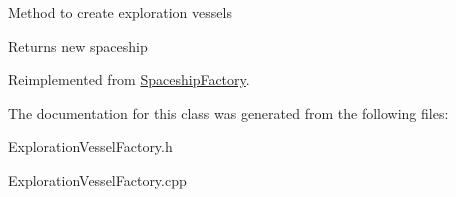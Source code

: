 Method to create exploration vessels \begin{DoxyReturn}{Returns}
new spaceship 
\end{DoxyReturn}


Reimplemented from \hyperlink{classSpaceshipFactory_a146f5e82385a55e9bf4ce63e28f99a9d}{Spaceship\+Factory}.



The documentation for this class was generated from the following files\+:\begin{DoxyCompactItemize}
\item 
Exploration\+Vessel\+Factory.\+h\item 
Exploration\+Vessel\+Factory.\+cpp\end{DoxyCompactItemize}
